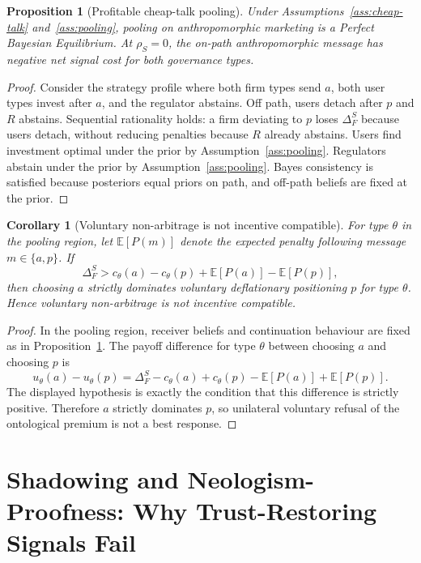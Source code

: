 \documentclass[preprint,authoryear]{elsarticle}
\newtheorem{proposition}{Proposition}
\newtheorem{corollary}{Corollary}
\theoremstyle{definition}
\theoremstyle{plain}
\begin{document}
\begin{proposition}[Profitable cheap-talk pooling]
\label{prop:pooling-pbe}
\label{thm:pooling}
Under Assumptions~\ref{ass:cheap-talk} and~\ref{ass:pooling}, pooling on anthropomorphic marketing is a Perfect Bayesian Equilibrium.  At $\rho_S=0$, the on-path anthropomorphic message has negative net signal cost for both governance types.
\end{proposition}
\begin{proof}
Consider the strategy profile where both firm types send $a$, both user types invest after $a$, and the regulator abstains.  Off path, users detach after $p$ and $R$ abstains.  Sequential rationality holds: a firm deviating to $p$ loses $\Delta_F^S$ because users detach, without reducing penalties because $R$ already abstains.  Users find investment optimal under the prior by Assumption~\ref{ass:pooling}.  Regulators abstain under the prior by Assumption~\ref{ass:pooling}.  Bayes consistency is satisfied because posteriors equal priors on path, and off-path beliefs are fixed at the prior.
\end{proof}

\begin{corollary}[Voluntary non-arbitrage is not incentive compatible]
\label{cor:voluntary-non-arbitrage}
For type $\theta$ in the pooling region, let $\mathbb{E}[P(m)]$ denote the expected penalty following message $m\in\{a,p\}$. If
\[
\Delta_F^S
>
c_\theta(a)-c_\theta(p)+\mathbb{E}[P(a)]-\mathbb{E}[P(p)],
\]
then choosing $a$ strictly dominates voluntary deflationary positioning $p$ for type $\theta$. Hence voluntary non-arbitrage is not incentive compatible.
\end{corollary}
\begin{proof}
In the pooling region, receiver beliefs and continuation behaviour are fixed as in Proposition~\ref{prop:pooling-pbe}. The payoff difference for type $\theta$ between choosing $a$ and choosing $p$ is
\[
u_\theta(a)-u_\theta(p)
=
\Delta_F^S-c_\theta(a)+c_\theta(p)-\mathbb{E}[P(a)]+\mathbb{E}[P(p)].
\]
The displayed hypothesis is exactly the condition that this difference is strictly positive. Therefore $a$ strictly dominates $p$, so unilateral voluntary refusal of the ontological premium is not a best response.
\end{proof}

\section{Shadowing and Neologism-Proofness: Why Trust-Restoring Signals Fail}
\label{sec:shadowing}
\end{document}
